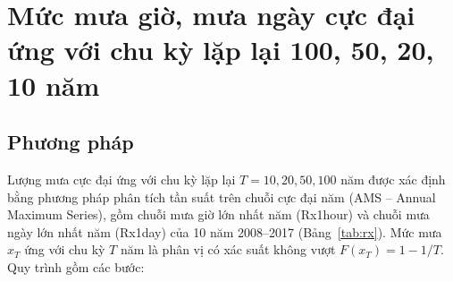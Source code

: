 \section{Mức mưa giờ, mưa ngày cực đại ứng với chu kỳ lặp lại 100, 50, 20, 10 năm}
\label{sec:chuky}

\subsection{Phương pháp}

Lượng mưa cực đại ứng với chu kỳ lặp lại $T = 10, 20, 50, 100$ năm được xác định bằng phương pháp phân tích tần suất trên chuỗi cực đại năm (AMS -- Annual Maximum Series), gồm chuỗi mưa giờ lớn nhất năm (Rx1hour) và chuỗi mưa ngày lớn nhất năm (Rx1day) của 10 năm 2008--2017 (Bảng~\ref{tab:rx}). Mức mưa $x_T$ ứng với chu kỳ $T$ năm là phân vị có xác suất không vượt $F(x_T) = 1 - 1/T$. Quy trình gồm các bước:

